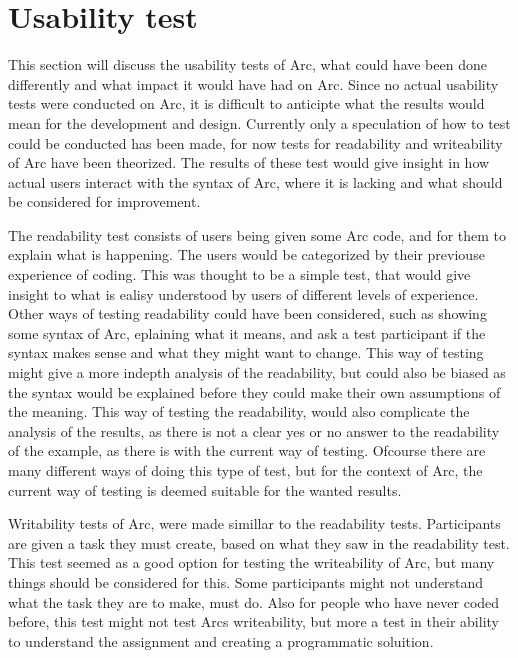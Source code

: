 %

\section{Usability test}
This section will discuss the usability tests of Arc, what could have been done differently and what impact it would have had on Arc. Since no actual usability tests were conducted on Arc, it is difficult to anticipte what the results would mean for the development and design. Currently only a speculation of how to test could be conducted has been made, for now tests for readability and writeability of Arc have been theorized. The results of these test would give insight in how actual users interact with the syntax of Arc, where it is lacking and what should be considered for improvement. 

The readability test consists of users being given some Arc code, and for them to explain what is happening. The users would be categorized by their previouse experience of coding. This was thought to be a simple test, that would give insight to what is ealisy understood by users of different levels of experience. Other ways of testing readability could have been considered, such as showing some syntax of Arc, eplaining what it means, and ask a test participant if the syntax makes sense and what they might want to change. This way of testing might give a more indepth analysis of the readability, but could also be biased as the syntax would be explained before they could make their own assumptions of the meaning. This way of testing the readability, would also complicate the analysis of the results, as there is not a clear yes or no answer to the readability of the example, as there is with the current way of testing. Ofcourse there are many different ways of doing this type of test, but for the context of Arc, the current way of testing is deemed suitable for the wanted results.

Writability tests of Arc, were made simillar to the readability tests. Participants are given a task they must create, based on what they saw in the readability test. This test seemed as a good option for testing the writeability of Arc, but many things should be considered for this. Some participants might not understand what the task they are to make, must do. Also for people who have never coded before, this test might not test Arcs writeability, but more a test in their ability to understand the assignment and creating a programmatic soluition. 

